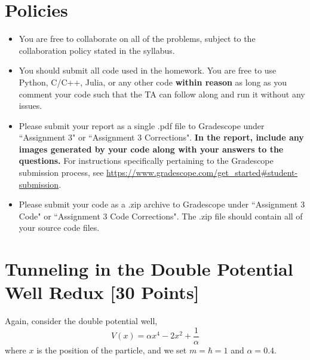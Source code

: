 \newif\ifshowsolutions
\showsolutionsfalse




\pagestyle{fancy}

\section*{Policies}
\begin{itemize}
  \item You are free to collaborate on all of the problems, subject to the collaboration policy stated in the syllabus.
  \item You should submit all code used in the homework.
        You are free to use Python, C/C++, Julia, or any other code \textbf{within reason} as long as you comment your code such that the TA can follow along and run it without any issues.
  \item Please submit your report as a single .pdf file to Gradescope under ``Assignment 3" or ``Assignment 3 Corrections".
        \textbf{In the report, include any images generated by your code along with your answers to the questions.}
        For instructions specifically pertaining to the Gradescope submission process, see \url{https://www.gradescope.com/get_started#student-submission}.
  \item Please submit your code as a .zip archive to Gradescope under ``Assignment 3 Code" or ``Assignment 3 Code Corrections".
        The .zip file should contain all of your source code files.
\end{itemize}

\newpage
\section{Tunneling in the Double Potential Well Redux [30 Points]}

Again, consider the double potential well,
\begin{equation}
  V(x) =  \alpha x^4  - 2x^2 + \frac{1}{\alpha}
\end{equation}
where $x$ is the position of the particle, and we set $m=\hbar=1$ and $\alpha = 0.4$.

